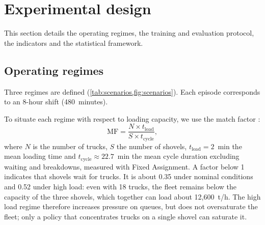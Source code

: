 \documentclass[11pt,a4paper]{article}
\newif\ifrevmarks
\newcommand{\revtag}[1]{\ifrevmarks\textsuperscript{\textcolor{red!70!black}{\scriptsize[#1]}}\fi}
\newenvironment{revbloc}[1]{\par\ifrevmarks\color{revcolor}\noindent\revtag{#1}\ \fi}{\par}
\newcommand{\adir}[1]{\ifrevmarks\textcolor{violet}{\textbf{[TO VALIDATE WITH THE SUPERVISOR: #1]}}\fi}
\begin{document}
\adir{target journal to be chosen after the results (proposed first choice: Computers \& Operations Research); Cluster Computing is outside the scope of the article (M28).}


\section{Experimental design}
\label{sec:design}

This section details the operating regimes, the training and evaluation protocol, the indicators and the statistical framework.

\subsection{Operating regimes}
\label{sec:scenarios}

Three regimes are defined (\cref{tab:scenarios,fig:scenarios}). Each episode corresponds to an 8-hour shift (480~minutes).

\begin{revbloc}{M15}
To situate each regime with respect to loading capacity, we use the match factor \cite{BurtCaccetta2014}:
\begin{equation}
\mathrm{MF} = \frac{N \times t_{\mathrm{load}}}{S \times t_{\mathrm{cycle}}} ,
\label{eq:mf}
\end{equation}
where $N$ is the number of trucks, $S$ the number of shovels, $t_{\mathrm{load}} = 2$~min the mean loading time and $t_{\mathrm{cycle}} \approx 22.7$~min the mean cycle duration excluding waiting and breakdowns, measured with Fixed Assignment. A factor below 1 indicates that shovels wait for trucks. It is about 0.35 under nominal conditions and 0.52 under high load: even with 18 trucks, the fleet remains below the capacity of the three shovels, which together can load about 12{,}600~t/h. The high load regime therefore increases pressure on queues, but does not oversaturate the fleet; only a policy that concentrates trucks on a single shovel can saturate it.
\end{revbloc}
\end{document}
